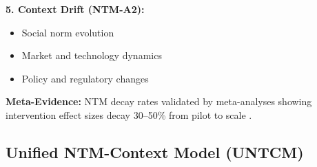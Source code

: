 \documentclass[11pt, a4paper]{article}
\begin{document}
\begin{tcolorbox}[colback=gray!5!white, colframe=gray!75!black,
    title=\textbf{Scientific Evidence for NTM Components}]
\vspace{0.5em}
\textbf{5. Context Drift (NTM-A2):}
\begin{itemize}[nosep]
\item Social norm evolution \citep{bicchieri2005grammar, cialdini2004social}
\item Market and technology dynamics \citep{rogers2003diffusion}
\item Policy and regulatory changes \citep{thaler2008nudge, sunstein2014nudging}
\end{itemize}

\textbf{Meta-Evidence:} NTM decay rates validated by meta-analyses showing intervention effect sizes decay 30--50\% from pilot to scale \citep{hummel2019effective, dellavigna2022rcts, soman2020successfully}.

\end{tcolorbox}



\subsection{Unified NTM-Context Model (UNTCM)}
\label{subsec:untcm}
\end{document}
